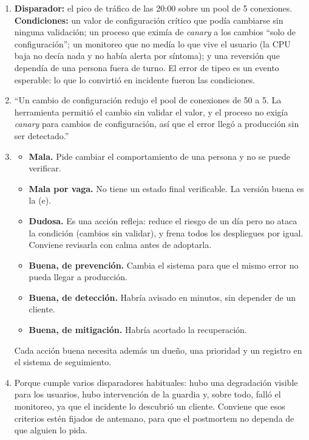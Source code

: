 \documentclass[variant=guia,cover=institutional,mode=screen]{ua-engineering-v6-article}
\begin{document}
\begin{uaanswer}
\begin{enumerate}
\item \textbf{Disparador:} el pico de tráfico de las 20:00 sobre un pool de 5 conexiones. \textbf{Condiciones:} un valor de configuración crítico que podía cambiarse sin ninguna validación; un proceso que eximía de \emph{canary} a los cambios ``solo de configuración''; un monitoreo que no medía lo que vive el usuario (la CPU baja no decía nada y no había alerta por síntoma); y una reversión que dependía de una persona fuera de turno. El error de tipeo es un evento esperable: lo que lo convirtió en incidente fueron las condiciones.
\item ``Un cambio de configuración redujo el pool de conexiones de 50 a 5. La herramienta permitió el cambio sin validar el valor, y el proceso no exigía \emph{canary} para cambios de configuración, así que el error llegó a producción sin ser detectado.''
\item \begin{itemize}
\item[(a)] \textbf{Mala.} Pide cambiar el comportamiento de una persona y no se puede verificar.
\item[(b)] \textbf{Mala por vaga.} No tiene un estado final verificable. La versión buena es la (e).
\item[(c)] \textbf{Dudosa.} Es una acción refleja: reduce el riesgo de un día pero no ataca la condición (cambios sin validar), y frena todos los despliegues por igual. Conviene revisarla con calma antes de adoptarla.
\item[(d)] \textbf{Buena, de prevención.} Cambia el sistema para que el mismo error no pueda llegar a producción.
\item[(e)] \textbf{Buena, de detección.} Habría avisado en minutos, sin depender de un cliente.
\item[(f)] \textbf{Buena, de mitigación.} Habría acortado la recuperación.
\end{itemize}
Cada acción buena necesita además un dueño, una prioridad y un registro en el sistema de seguimiento.
\item Porque cumple varios disparadores habituales: hubo una degradación visible para los usuarios, hubo intervención de la guardia y, sobre todo, falló el monitoreo, ya que el incidente lo descubrió un cliente. Conviene que esos criterios estén fijados de antemano, para que el postmortem no dependa de que alguien lo pida.
\end{enumerate}
\end{uaanswer}
\end{document}
